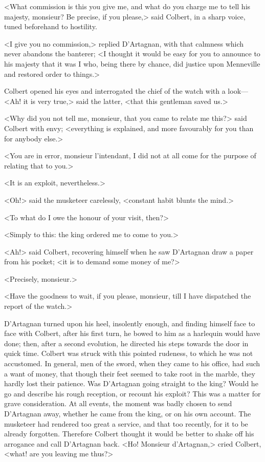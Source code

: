 <What commission is this you give me, and what do you charge me to tell his majesty, monsieur? Be precise, if you please,> said Colbert, in a sharp voice, tuned beforehand to hostility.

<I give you no commission,> replied D'Artagnan, with that calmness which never abandons the banterer; <I thought it would be easy for you to announce to his majesty that it was I who, being there by chance, did justice upon Menneville and restored order to things.>

Colbert opened his eyes and interrogated the chief of the watch with a look—<Ah! it is very true,> said the latter, <that this gentleman saved us.>

<Why did you not tell me, monsieur, that you came to relate me this?> said Colbert with envy; <everything is explained, and more favourably for you than for anybody else.>

<You are in error, monsieur l'intendant, I did not at all come for the purpose of relating that to you.>

<It is an exploit, nevertheless.>

<Oh!> said the musketeer carelessly, <constant habit blunts the mind.>

<To what do I owe the honour of your visit, then?>

<Simply to this: the king ordered me to come to you.>

<Ah!> said Colbert, recovering himself when he saw D'Artagnan draw a paper from his pocket; <it is to demand some money of me?>

<Precisely, monsieur.>

<Have the goodness to wait, if you please, monsieur, till I have dispatched the report of the watch.>

D'Artagnan turned upon his heel, insolently enough, and finding himself face to face with Colbert, after his first turn, he bowed to him as a harlequin would have done; then, after a second evolution, he directed his steps towards the door in quick time. Colbert was struck with this pointed rudeness, to which he was not accustomed. In general, men of the sword, when they came to his office, had such a want of money, that though their feet seemed to take root in the marble, they hardly lost their patience. Was D'Artagnan going straight to the king? Would he go and describe his rough reception, or recount his exploit? This was a matter for grave consideration. At all events, the moment was badly chosen to send D'Artagnan away, whether he came from the king, or on his own account. The musketeer had rendered too great a service, and that too recently, for it to be already forgotten. Therefore Colbert thought it would be better to shake off his arrogance and call D'Artagnan back. <Ho! Monsieur d'Artagnan,> cried Colbert, <what! are you leaving me thus?>

